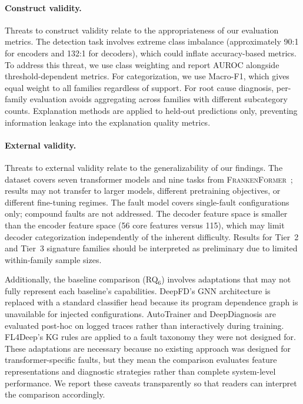 \paragraph{Construct validity.}
Threats to construct validity relate to the appropriateness of our evaluation metrics. The detection task involves extreme class imbalance (approximately 90:1 for encoders and 132:1 for decoders), which could inflate accuracy-based metrics. To address this threat, we use class weighting and report AUROC alongside threshold-dependent metrics. For categorization, we use Macro-F1, which gives equal weight to all families regardless of support. For root cause diagnosis, per-family evaluation avoids aggregating across families with different subcategory counts. Explanation methods are applied to held-out predictions only, preventing information leakage into the explanation quality metrics.

\paragraph{External validity.}
Threats to external validity relate to the generalizability of our findings. The dataset covers seven transformer models and nine tasks from \textsc{FrankenFormer}~\cite{frankenformer}; results may not transfer to larger models, different pretraining objectives, or different fine-tuning regimes. The fault model covers single-fault configurations only; compound faults are not addressed. The decoder feature space is smaller than the encoder feature space (56 core features versus 115), which may limit decoder categorization independently of the inherent difficulty. Results for Tier~2 and Tier~3 signature families should be interpreted as preliminary due to limited within-family sample sizes.

Additionally, the baseline comparison (RQ$_6$) involves adaptations that may not fully represent each baseline's capabilities. DeepFD's GNN architecture is replaced with a standard classifier head because its program dependence graph is unavailable for injected configurations. AutoTrainer and DeepDiagnosis are evaluated post-hoc on logged traces rather than interactively during training. FL4Deep's KG rules are applied to a fault taxonomy they were not designed for. These adaptations are necessary because no existing approach was designed for transformer-specific faults, but they mean the comparison evaluates feature representations and diagnostic strategies rather than complete system-level performance. We report these caveats transparently so that readers can interpret the comparison accordingly.

